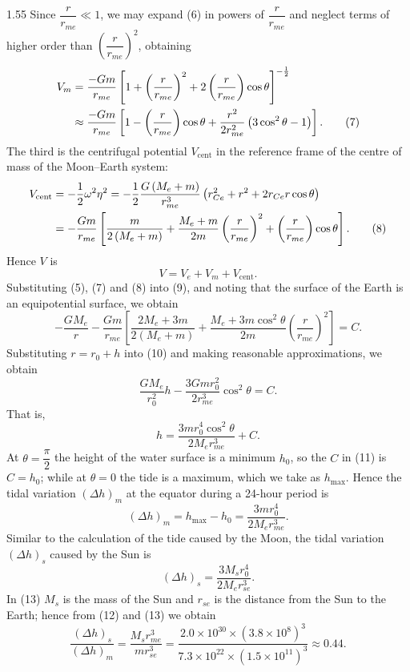 \begin{solution}{1.55}
Since $\dfrac{r}{r_{me}}\ll1$, we may expand (6) in powers of $\dfrac{r}{r_{me}}$ and neglect terms of higher order than $\left(\dfrac{r}{r_{me}}\right)^2$, obtaining
\begin{align}
V_m&=\frac{-Gm}{r_{me}}\left[1+\left(\frac{r}{r_{me}}\right)^2+2\left(\frac{r}{r_{me}}\right)\cos\theta\right]^{-\frac{1}{2}}\notag\\
&\approx\frac{-Gm}{r_{me}}\left[1-\left(\frac{r}{r_{me}}\right)\cos\theta+\frac{r^2}{2r_{me}^2}\left(3\cos^2\theta-1\right)\right]. \tag{7}
\end{align}
The third is the centrifugal potential $V_{\text{cent}}$ in the reference frame of the centre of mass of the Moon--Earth system:
\begin{align}
V_{\text{cent}}&=-\frac{1}{2}\omega^2\eta^2=-\frac{1}{2}\frac{G\left(M_e+m\right)}{r_{me}^3}\left(r_{Ce}^2+r^2+2r_{Ce}r\cos\theta\right)\notag\\
&=-\frac{Gm}{r_{me}}\left[\frac{m}{2\left(M_e+m\right)}+\frac{M_e+m}{2m}\left(\frac{r}{r_{me}}\right)^2+\left(\frac{r}{r_{me}}\right)\cos\theta\right]. \tag{8}
\end{align}
Hence $V$ is
\begin{equation}
V=V_e+V_m+V_{\text{cent}}. \tag{9}
\end{equation}
Substituting (5), (7) and (8) into (9), and noting that the surface of the Earth is an equipotential surface, we obtain
\begin{equation}
-\frac{GM_e}{r}-\frac{Gm}{r_{me}}\left[\frac{2M_e+3m}{2\left(M_e+m\right)}+\frac{M_e+3m\cos^2\theta}{2m}\left(\frac{r}{r_{me}}\right)^2\right]=C. \tag{10}
\end{equation}
Substituting $r=r_0+h$ into (10) and making reasonable approximations, we obtain
\[
\frac{GM_e}{r_0^2}h-\frac{3Gmr_0^2}{2r_{me}^3}\cos^2\theta=C.
\]
That is,
\begin{equation}
h=\frac{3mr_0^4\cos^2\theta}{2M_er_{me}^3}+C. \tag{11}
\end{equation}
At $\theta=\dfrac{\pi}{2}$ the height of the water surface is a minimum $h_0$, so the $C$ in (11) is $C=h_0$; while at $\theta=0$ the tide is a maximum, which we take as $h_{\max}$. Hence the tidal variation $(\Delta h)_m$ at the equator during a 24-hour period is
\begin{equation}
(\Delta h)_m=h_{\max}-h_0=\frac{3mr_0^4}{2M_er_{me}^3}. \tag{12}
\end{equation}
Similar to the calculation of the tide caused by the Moon, the tidal variation $(\Delta h)_s$ caused by the Sun is
\begin{equation}
(\Delta h)_s=\frac{3M_sr_0^4}{2M_er_{se}^3}. \tag{13}
\end{equation}
In (13) $M_s$ is the mass of the Sun and $r_{se}$ is the distance from the Sun to the Earth; hence from (12) and (13) we obtain
\[
\frac{(\Delta h)_s}{(\Delta h)_m}=\frac{M_sr_{me}^3}{mr_{se}^3}
=\frac{2.0\times10^{30}\times\left(3.8\times10^8\right)^3}{7.3\times10^{22}\times\left(1.5\times10^{11}\right)^3}\approx0.44.
\]
\end{solution}

